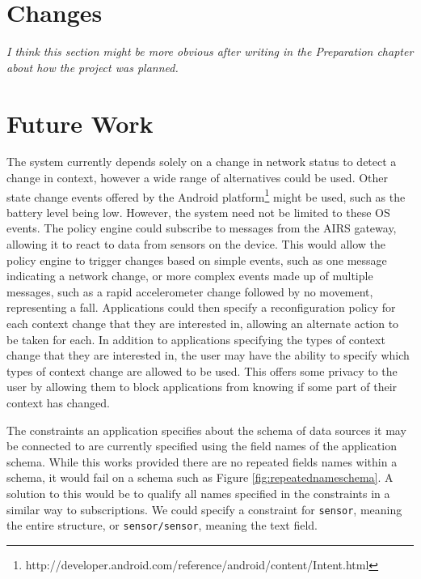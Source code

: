 \documentclass[12pt,twoside,notitlepage]{report}
\begin{document}
\section{Changes}
{\sl I think this section might be more obvious after writing in the Preparation chapter about how the project was planned. }


\section{Future Work}

The system currently depends solely on a change in network status to detect a change in context, however a wide range of alternatives could be used. 
Other state change events offered by the Android platform\footnote{http://developer.android.com/reference/android/content/Intent.html} might be used, such as the battery level being low. 
However, the system need not be limited to these OS events. 
The policy engine could subscribe to messages from the AIRS gateway, allowing it to react to data from sensors on the device. 
This would allow the policy engine to trigger changes based on simple events, such as one message indicating a network change, or more complex events made up of multiple messages, such as a rapid accelerometer change followed by no movement, representing a fall. 
Applications could then specify a reconfiguration policy for each context change that they are interested in, allowing an alternate action to be taken for each. 
In addition to applications specifying the types of context change that they are interested in, the user may have the ability to specify which types of context change are allowed to be used. 
This offers some privacy to the user by allowing them to block applications from knowing if some part of their context has changed.

The constraints an application specifies about the schema of data sources it may be connected to are currently specified using the field names of the application schema.
While this works provided there are no repeated fields names within a schema, it would fail on a schema such as Figure \ref{fig:repeatednameschema}. 
A solution to this would be to qualify all names specified in the constraints in a similar way to subscriptions. 
We could specify a constraint for {\tt sensor}, meaning the entire structure, or {\tt sensor/sensor}, meaning the text field.
\end{document}

